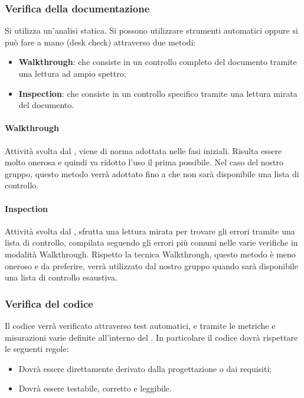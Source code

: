 \subsubsection{Verifica della documentazione}
Si utilizza un'analisi statica. Si possono utilizzare strumenti automatici oppure si può fare a mano (desk check) attraverso due metodi:
\begin{itemize}
\item \textbf{Walkthrough}: che consiste in un controllo completo del documento tramite una lettura ad ampio spettro;
\item \textbf{Inspection}: che consiste in un controllo specifico tramite una lettura mirata del documento.
\end{itemize}

\paragraph{Walkthrough}
Attività svolta dal \VE{}, viene di norma adottata nelle fasi iniziali. Risulta essere molto onerosa e quindi va ridotto l'uso il prima possibile. Nel caso del nostro gruppo, questo metodo verrà adottato fino a che non sarà disponibile una lista di controllo.

\paragraph{Inspection}
Attività svolta dal \VE{}, sfrutta una lettura mirata per trovare gli errori tramite una lista di controllo, compilata seguendo gli errori più comuni nelle varie verifiche in modalità Walkthrough. Rispetto la tecnica Walkthrough, questo metodo è meno oneroso e da preferire, verrà utilizzato dal nostro gruppo quando sarà disponibile una lista di controllo esaustiva.


\subsubsection{Verifica del codice}
Il codice verrà verificato attraverso test automatici, e tramite le metriche e misurazioni varie definite all'interno del \PdQ. 
In particolare il codice dovrà rispettare le seguenti regole:
\begin{itemize}
\item Dovrà essere direttamente derivato dalla progettazione o dai requisiti;
\item Dovrà essere testabile, corretto e leggibile.
\end{itemize}

